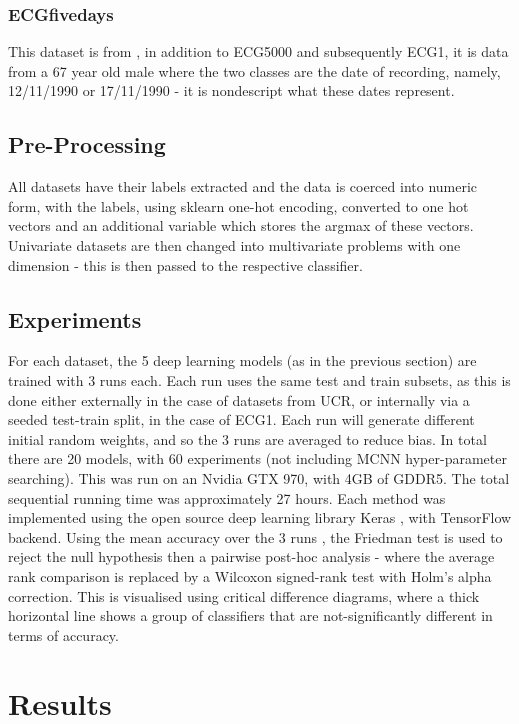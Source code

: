 \documentclass[journal]{IEEEtran}
\begin{document}
\subsubsection{ECGfivedays}
This dataset is from \cite{Chen2014}, in addition to ECG5000 and subsequently ECG1, it is data from a 67 year old male where the two classes are the date of recording, namely, 12/11/1990 or 17/11/1990 - it is nondescript what these dates represent.

\subsection{Pre-Processing}
All datasets have their labels extracted and the data is coerced into numeric form, with the labels, using sklearn one-hot encoding, converted to one hot vectors and an additional variable which stores the argmax of these vectors. Univariate datasets are then changed into multivariate problems with one dimension - this is then passed to the respective classifier.


\subsection{Experiments}
For each dataset, the 5 deep learning models (as in the previous section) are trained with 3 runs each. Each run uses the same test and train subsets, as this is done either externally in the case of datasets from UCR, or internally via a seeded test-train split, in the case of ECG1. Each run will generate different initial random weights, and so the 3 runs are averaged to reduce bias. In total there are 20 models, with 60 experiments (not including MCNN hyper-parameter searching). This was run on an Nvidia GTX 970, with 4GB of GDDR5. The total sequential running time was approximately 27 hours. Each method was implemented using the open source deep learning library Keras \cite{chollet2015keras}, with TensorFlow \cite{tensorflow2015} backend. Using the mean accuracy over the 3 runs \cite{grabocka2014}, the Friedman test is used to reject the null hypothesis then a pairwise post-hoc analysis - where the average rank comparison is replaced by a Wilcoxon signed-rank test with Holm's alpha correction. This is visualised using critical difference diagrams, where a thick horizontal line shows a group of classifiers that are not-significantly different in terms of accuracy.

\section{Results}
\end{document}
